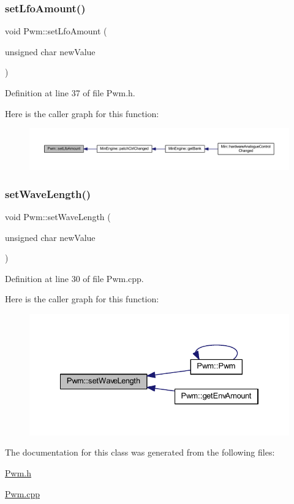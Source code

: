 \subsubsection{\texorpdfstring{set\+Lfo\+Amount()}{setLfoAmount()}}
{\footnotesize\ttfamily void Pwm\+::set\+Lfo\+Amount (\begin{DoxyParamCaption}\item[{unsigned char}]{new\+Value }\end{DoxyParamCaption})\hspace{0.3cm}{\ttfamily [inline]}}



Definition at line 37 of file Pwm.\+h.

Here is the caller graph for this function\+:
\nopagebreak
\begin{figure}[H]
\begin{center}
\leavevmode
\includegraphics[width=350pt]{d6/df6/class_pwm_a1fe2ceb8636015244b4d3ed7ef15b333_icgraph}
\end{center}
\end{figure}
\mbox{\label{class_pwm_a65828f1098ab41b17141dd614aa420ec}} 
\subsubsection{\texorpdfstring{set\+Wave\+Length()}{setWaveLength()}}
{\footnotesize\ttfamily void Pwm\+::set\+Wave\+Length (\begin{DoxyParamCaption}\item[{unsigned char}]{new\+Value }\end{DoxyParamCaption})}



Definition at line 30 of file Pwm.\+cpp.

Here is the caller graph for this function\+:
\nopagebreak
\begin{figure}[H]
\begin{center}
\leavevmode
\includegraphics[width=334pt]{d6/df6/class_pwm_a65828f1098ab41b17141dd614aa420ec_icgraph}
\end{center}
\end{figure}


The documentation for this class was generated from the following files\+:\begin{DoxyCompactItemize}
\item 
\hyperlink{_pwm_8h}{Pwm.\+h}\item 
\hyperlink{_pwm_8cpp}{Pwm.\+cpp}\end{DoxyCompactItemize}
